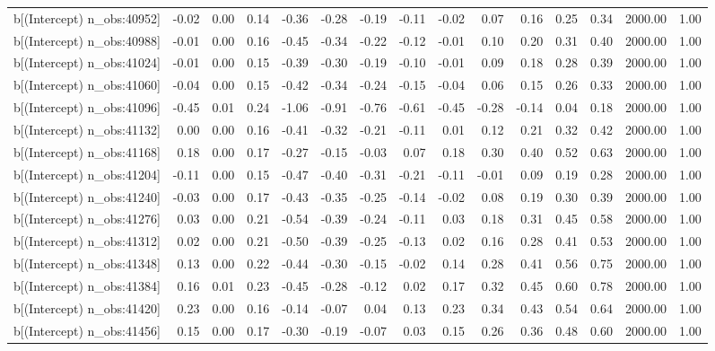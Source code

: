 \begin{table}[ht]
\begin{tabular}{rrrrrrrrrrrrrrr}
  b[(Intercept) n\_obs:40952] & -0.02 & 0.00 & 0.14 & -0.36 & -0.28 & -0.19 & -0.11 & -0.02 & 0.07 & 0.16 & 0.25 & 0.34 & 2000.00 & 1.00 \\ 
  b[(Intercept) n\_obs:40988] & -0.01 & 0.00 & 0.16 & -0.45 & -0.34 & -0.22 & -0.12 & -0.01 & 0.10 & 0.20 & 0.31 & 0.40 & 2000.00 & 1.00 \\ 
  b[(Intercept) n\_obs:41024] & -0.01 & 0.00 & 0.15 & -0.39 & -0.30 & -0.19 & -0.10 & -0.01 & 0.09 & 0.18 & 0.28 & 0.39 & 2000.00 & 1.00 \\ 
  b[(Intercept) n\_obs:41060] & -0.04 & 0.00 & 0.15 & -0.42 & -0.34 & -0.24 & -0.15 & -0.04 & 0.06 & 0.15 & 0.26 & 0.33 & 2000.00 & 1.00 \\ 
  b[(Intercept) n\_obs:41096] & -0.45 & 0.01 & 0.24 & -1.06 & -0.91 & -0.76 & -0.61 & -0.45 & -0.28 & -0.14 & 0.04 & 0.18 & 2000.00 & 1.00 \\ 
  b[(Intercept) n\_obs:41132] & 0.00 & 0.00 & 0.16 & -0.41 & -0.32 & -0.21 & -0.11 & 0.01 & 0.12 & 0.21 & 0.32 & 0.42 & 2000.00 & 1.00 \\ 
  b[(Intercept) n\_obs:41168] & 0.18 & 0.00 & 0.17 & -0.27 & -0.15 & -0.03 & 0.07 & 0.18 & 0.30 & 0.40 & 0.52 & 0.63 & 2000.00 & 1.00 \\ 
  b[(Intercept) n\_obs:41204] & -0.11 & 0.00 & 0.15 & -0.47 & -0.40 & -0.31 & -0.21 & -0.11 & -0.01 & 0.09 & 0.19 & 0.28 & 2000.00 & 1.00 \\ 
  b[(Intercept) n\_obs:41240] & -0.03 & 0.00 & 0.17 & -0.43 & -0.35 & -0.25 & -0.14 & -0.02 & 0.08 & 0.19 & 0.30 & 0.39 & 2000.00 & 1.00 \\ 
  b[(Intercept) n\_obs:41276] & 0.03 & 0.00 & 0.21 & -0.54 & -0.39 & -0.24 & -0.11 & 0.03 & 0.18 & 0.31 & 0.45 & 0.58 & 2000.00 & 1.00 \\ 
  b[(Intercept) n\_obs:41312] & 0.02 & 0.00 & 0.21 & -0.50 & -0.39 & -0.25 & -0.13 & 0.02 & 0.16 & 0.28 & 0.41 & 0.53 & 2000.00 & 1.00 \\ 
  b[(Intercept) n\_obs:41348] & 0.13 & 0.00 & 0.22 & -0.44 & -0.30 & -0.15 & -0.02 & 0.14 & 0.28 & 0.41 & 0.56 & 0.75 & 2000.00 & 1.00 \\ 
  b[(Intercept) n\_obs:41384] & 0.16 & 0.01 & 0.23 & -0.45 & -0.28 & -0.12 & 0.02 & 0.17 & 0.32 & 0.45 & 0.60 & 0.78 & 2000.00 & 1.00 \\ 
  b[(Intercept) n\_obs:41420] & 0.23 & 0.00 & 0.16 & -0.14 & -0.07 & 0.04 & 0.13 & 0.23 & 0.34 & 0.43 & 0.54 & 0.64 & 2000.00 & 1.00 \\ 
  b[(Intercept) n\_obs:41456] & 0.15 & 0.00 & 0.17 & -0.30 & -0.19 & -0.07 & 0.03 & 0.15 & 0.26 & 0.36 & 0.48 & 0.60 & 2000.00 & 1.00 \\ 

\end{tabular}
\end{table}
